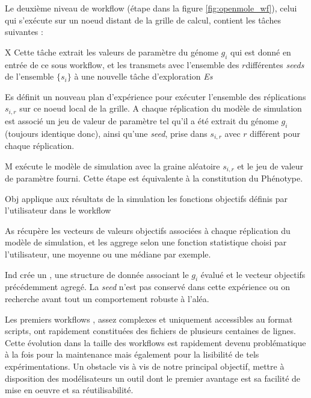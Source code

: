 Le deuxième niveau de workflow (étape  dans la figure \ref{fig:openmole_wf}), celui qui s'exécute sur un noeud distant de la grille de calcul, contient les tâches suivantes :

\begin{myitemize}

\item[X] Cette tâche extrait les valeurs de paramètre du génome $g_i$ qui est donné en entrée de ce sous workflow, et les transmets avec l'ensemble des $r$différentes \textit{seeds} de l'ensemble $\{s_i\}$ à une nouvelle tâche d'exploration \textit{Es}

\item[Es] définit un nouveau plan d'expérience pour exécuter l'ensemble des réplications $s_{i,r}$ sur ce noeud local de la grille. A chaque réplication du modèle de simulation est associé un jeu de valeur de paramètre tel qu'il a été extrait du génome $g_i$ (toujours identique donc), ainsi qu'une \textit{seed}, prise dans $s_{i,r}$ avec $r$ différent pour chaque réplication.

\item[M] exécute le modèle de simulation avec la graine aléatoire $s_{i,r}$ et le jeu de valeur de paramètre fourni. Cette étape est équivalente à la constitution du Phénotype.

\item[Obj] applique aux résultats de la simulation les fonctions objectifs définis par l'utilisateur dans le workflow

\item[As] récupère les vecteurs de valeurs objectifs associées à chaque réplication du modèle de simulation, et les aggrege selon une fonction statistique choisi par l'utilisateur, une moyenne ou une médiane par exemple.

\item[Ind] crée un , une structure de donnée associant le  $g_i$ évalué et le vecteur objectifs précédemment agregé. La \textit{seed} n'est pas conservé dans cette expérience ou on recherche avant tout un comportement robuste à l'aléa.

\end{myitemize}

Les premiers workflows , assez complexes et uniquement accessibles au format scripts, ont rapidement constituées des fichiers de plusieurs centaines de lignes. Cette évolution dans la taille des workflows est rapidement devenu problématique à la fois pour la maintenance mais également pour la lisibilité de tels expérimentations. Un obstacle vis à vis de notre principal objectif, mettre à disposition des modélisateurs un outil dont le premier avantage est sa facilité de mise en oeuvre et sa réutilisabilité.

